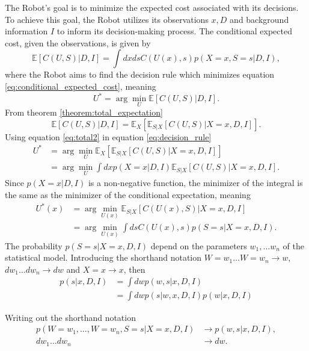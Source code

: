 	The Robot's goal is to minimize the expected cost associated with its decisions. To achieve this goal, the Robot utilizes its observations $x,D$ and background information $I$ to inform its decision-making process. The conditional expected cost, given the observations, is given by
	\begin{equation}
		\mathbb{E}[C(U, S)|D,I] = \int dx ds C(U(x),s) p(X=x,S=s|D,I),
		\label{eq:conditional_expected_cost}
	\end{equation}
	where the Robot aims to find the decision rule which minimizes equation \eqref{eq:conditional_expected_cost}, meaning
	\begin{equation}
		U^* = \arg\min_{U} \mathbb{E}[C(U, S)|D,I].
		\label{eq:decision_rule}
	\end{equation}	
	From theorem \ref{theorem:total_expectation}
	\begin{equation}
		\mathbb{E}[C(U, S)|D,I] = \mathbb{E}_X[\mathbb{E}_{S|X}[C(U, S)|X=x,D,I]].
		\label{eq:total2}
	\end{equation}
	Using equation \eqref{eq:total2} in equation \eqref{eq:decision_rule}
	\begin{equation}
		\begin{split}
			U^* &= \arg\min_{U} \mathbb{E}_X[\mathbb{E}_{S|X}[C(U, S)|X=x,D,I]]\\
			&= \arg\min_{U} \int dxp(X=x|D,I) \mathbb{E}_{S|X}[C(U, S)|X=x,D,I].
		\end{split}
		\label{eq:decision_rule2}
	\end{equation}
	Since $p(X=x|D,I)$ is a non-negative function, the minimizer of the integral is the same as the minimizer of the conditional expectation, meaning
	\begin{equation}
		\begin{split}
			U^*(x) &= \arg\min_{U(x)} \mathbb{E}_{S|X}[C(U(x), S)|X=x,D,I]\\
			& = \arg\min_{U(x)}\int  ds C(U(x),s) p(S=s|X=x,D,I).
		\end{split}
		\label{eq:decision_rule3}
	\end{equation}
	The probability $p(S=s|X=x,D,I)$ depend on the parameters $w_1,\dots w_n$ of the statistical model. Introducing the shorthand notation $W=w_1\dots W=w_n \rightarrow w$, $dw_1\dots dw_n \rightarrow dw$ and $X=x \rightarrow x$, then
	\begin{equation}
		\begin{split}
			p(s|x,D,I) &= \int dw p(w,s|x,D,I)\\
			& = \int dw p(s|w,x,D,I)p(w|x,D,I)
		\end{split}
		\label{eq:hest1}
	\end{equation}
	\begin{example}
		Writing out the shorthand notation
		\begin{equation}
			 \begin{split}
			 	p(W=w_1,\dots,W= w_n,S = s|X = x,D,I)&\rightarrow p(w,s|x,D,I),\\
			 	dw_1\dots dw_n &\rightarrow dw.\\
			 \end{split}
		\end{equation}
	\end{example}
	
